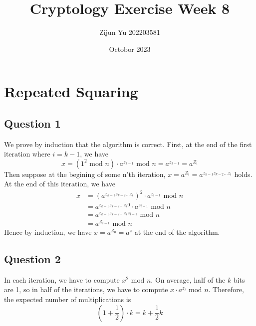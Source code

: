 \documentclass{article}
\title{Cryptology Exercise Week 8}
\author{Zijun Yu 202203581}
\date{Octobor 2023}
\begin{document}
\maketitle

\section*{Repeated Squaring}

\subsection*{Question 1}
We prove by induction that the algorithm is correct. First, at the end of the first iteration
where $i=k-1$, we have
$$x = (1^2 \text{ mod } n) \cdot a^{z_{k-1}} \text{ mod } n = a^{z_{k-1}} = a^{Z_i}$$
Then suppose at the begining of some n'th iteration, $x=a^{Z_i}=a^{z_{k-1}z_{k-2}...z_{i}}$ holds.
At the end of this iteration, we have
\begin{equation*}
    \begin{split}
        x &= \left(a^{z_{k-1}z_{k-2}...z_{i}}\right)^2 \cdot a^{z_{i-1}} \text{ mod } n \\
        &= a^{z_{k-1}z_{k-2}...z_{i}0} \cdot a^{z_{i-1}} \text{ mod } n \\
        &= a^{z_{k-1}z_{k-2}...z_{i}z_{i-1}} \text{ mod } n \\
        &= a^{Z_{i-1}} \text{ mod } n
    \end{split}
\end{equation*}
Hence by induction, we have $x=a^{Z_0}=a^z$ at the end of the algorithm.

\subsection*{Question 2}
In each iteration, we have to compute $x^2 \text{ mod } n$.
On average, half of the $k$ bits are 1, so in half of the iterations, we have to compute
$x \cdot a^{z_i} \text{ mod } n$. Therefore, the expected number of multiplications is
$$(1+\frac{1}{2}) \cdot k = k + \frac{1}{2}k$$
\end{document}
